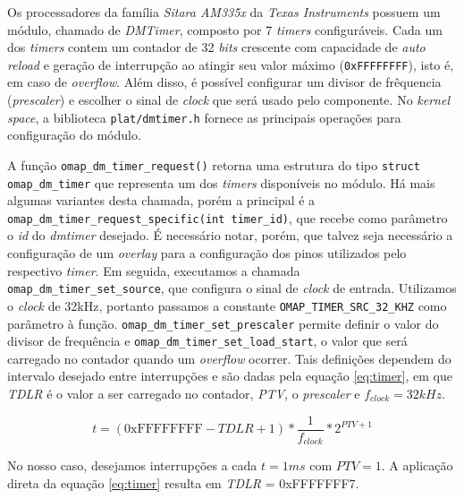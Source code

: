 	\FloatBarrier 

Os processadores da família \textit{Sitara AM335x} da \textit{Texas Instruments}
possuem um módulo, chamado de \textit{DMTimer}, composto por 7 \textit{timers}
configuráveis. Cada um dos \textit{timers} contem um contador de 32
\textit{bits} crescente com capacidade de \textit{auto reload} e geração de
interrupção ao atingir seu valor máximo (\texttt{0xFFFFFFFF}), isto é, em caso
de \textit{overflow}. Além disso, é possível configurar um divisor de frêquencia
(\textit{prescaler}) e escolher o sinal de \textit{clock} que será usado pelo
componente. No \textit{kernel space}, a biblioteca \texttt{plat/dmtimer.h}
fornece as principais operações para configuração do módulo. 

\vspace{12pt}

A função \texttt{omap\_dm\_timer\_request()} retorna uma estrutura do tipo
\texttt{struct omap\_dm\_timer} que representa um dos \textit{timers}
disponíveis no módulo. Há mais algumas variantes desta chamada, porém a
principal é a \texttt{omap\_dm\_timer\_request\_specific(int timer\_id)}, que
recebe como parâmetro o \textit{id} do \textit{dmtimer} desejado. É necessário
notar, porém, que talvez seja necessário a configuração de um \textit{overlay}
para a configuração dos pinos utilizados pelo respectivo \textit{timer}. Em
seguida, executamos a chamada \texttt{omap\_dm\_timer\_set\_source}, que
configura o sinal de \textit{clock} de entrada. Utilizamos o \textit{clock} de
32kHz, portanto passamos a constante \texttt{OMAP\_TIMER\_SRC\_32\_KHZ} como
parâmetro à função. \texttt{omap\_dm\_timer\_set\_prescaler} permite definir o
valor do divisor de frequência e \texttt{omap\_dm\_timer\_set\_load\_start}, o
valor que será carregado no contador quando um \textit{overflow} ocorrer. Tais
definições dependem do intervalo desejado entre interrupções e são dadas pela
equação \ref{eq:timer}, em que \textit{TDLR} é o valor a ser carregado no
contador, \textit{PTV}, o \textit{prescaler} e \(f_{clock}=32kHz\).

\begin{equation} 
t = (\text{0xFFFFFFFF} - TDLR + 1)*\frac{1}{f_{clock}}*2^{PTV+1}
\label{eq:timer}
\end{equation}

No nosso caso, desejamos interrupções a cada \(t=1ms\) com \(PTV=1\). A
aplicação direta da equação \ref{eq:timer} resulta em \textit{TDLR} =
0xFFFFFFF7.

\vspace{12pt}

